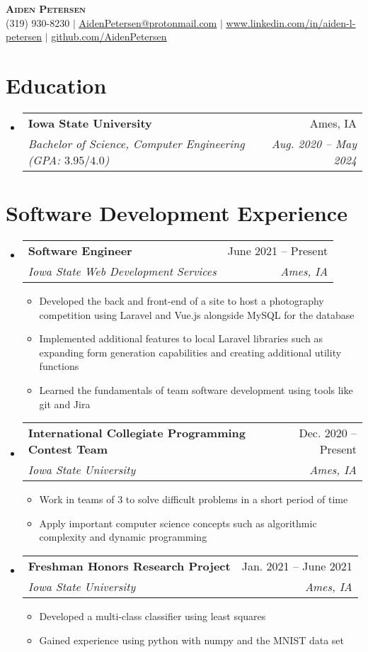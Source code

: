 \documentclass[letterpaper,12pt]{article}
\makeatletter
\newcommand{\resumeItem}[1]{
  \item\small{
    {#1 \vspace{-2pt}}
  }
}
\newcommand{\resumeSubheading}[4]{
  \vspace{2pt}\item
    \begin{tabular*}{0.97\textwidth}[t]{l@{\extracolsep{\fill}}r}
      \textbf{#1} & #2 \\
      \textit{\small#3} & \textit{\small #4} \\
    \end{tabular*}\vspace{-7pt}
}
\newcommand{\resumeSubHeadingListStart}{\vspace{2pt}\begin{itemize}[leftmargin=0.15in, label={}]}
\newcommand{\resumeSubHeadingListEnd}{\end{itemize}}
\newcommand{\resumeItemListStart}{\begin{itemize}}
\newcommand{\resumeItemListEnd}{\end{itemize}\vspace{-5pt}}
\makeatother
\begin{document}
\begin{center}
    \textbf{\Huge \scshape Aiden Petersen} \\ \vspace{10pt}
    \small (319) 930-8230 $|$ \href{mailto:x@x.com}{\underline{AidenPetersen@protonmail.com}} $|$ 
    \href{https://linkedin.com/in/...}{\underline{ www.linkedin.com/in/aiden-l-petersen}} $|$
    \href{https://github.com/...}{\underline{github.com/AidenPetersen}}
\end{center}


    
\section{Education}
  \resumeSubHeadingListStart
    \resumeSubheading
      {Iowa State University}{Ames, IA}
      {Bachelor of Science, Computer Engineering (GPA: $3.95/4.0$)}{Aug. 2020 -- May 2024}
  \resumeSubHeadingListEnd


\section{Software Development Experience}
  \resumeSubHeadingListStart

    \resumeSubheading
      {Software Engineer}{June 2021 -- Present}
      {Iowa State Web Development Services}{Ames, IA}
      \resumeItemListStart
        \resumeItem{Developed the back and front-end of a site to host a photography competition using Laravel and Vue.js alongside MySQL for the database}
        \resumeItem{Implemented additional features to local Laravel libraries such as expanding form generation capabilities and creating additional utility functions}
        \resumeItem{Learned the fundamentals of team software development using tools like git and Jira}
      \resumeItemListEnd

    \resumeSubheading
            {International Collegiate Programming Contest Team}{Dec. 2020 -- Present}
            {Iowa State University}{Ames, IA}
            \resumeItemListStart
            \resumeItem{Work in teams of 3 to solve difficult problems in a short period of time}
            \resumeItem{Apply important computer science concepts such as algorithmic complexity and dynamic programming}
        \resumeItemListEnd
        \resumeSubheading
        {Freshman Honors Research Project}{Jan. 2021 -- June 2021}
        {Iowa State University}{Ames, IA}
        \resumeItemListStart
            \resumeItem {Developed a multi-class classifier using least squares}
            \resumeItem{Gained experience using python with numpy and the MNIST data set}
        \resumeItemListEnd
    \resumeSubHeadingListEnd
      
\end{document}
